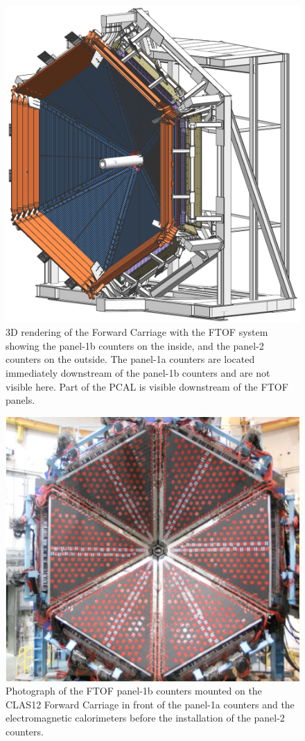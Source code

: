 \documentclass[final,3p]{elsarticle}
\begin{document}
\begin{twocolumn}
\begin{figure}[t!]
\includegraphics[width=0.95\columnwidth]{fwd_carriage-1.png}
\caption{3D rendering of the Forward Carriage with the FTOF system showing the panel-1b counters on the
inside, and the panel-2 counters on the outside. The panel-1a counters are located immediately downstream of the
panel-1b counters and are not visible here. Part of the PCAL is visible downstream of the FTOF panels.}
\label{ftof-model}
\end{figure}
\begin{figure} [htp!]
\includegraphics[width=1.0\columnwidth]{FTOF-1b.png}
\caption{Photograph of the FTOF panel-1b counters mounted on the CLAS12 Forward Carriage in front of the
  panel-1a counters and the electromagnetic calorimeters before the installation of the panel-2 counters.} 
\label{ftof-1b}
\end{figure}


\end{twocolumn}
\end{document}

